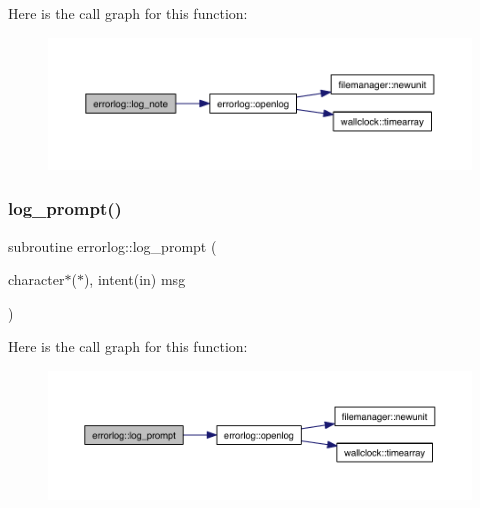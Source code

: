 Here is the call graph for this function\+:\nopagebreak
\begin{figure}[H]
\begin{center}
\leavevmode
\includegraphics[width=350pt]{namespaceerrorlog_abcaf87ab55e0634007cc7177aa53469c_cgraph}
\end{center}
\end{figure}
\mbox{\label{namespaceerrorlog_ac6531d63b5a5d4939c3d510dd7fbbb25}} 
\subsubsection{\texorpdfstring{log\+\_\+prompt()}{log\_prompt()}}
{\footnotesize\ttfamily subroutine errorlog\+::log\+\_\+prompt (\begin{DoxyParamCaption}\item[{character$\ast$($\ast$), intent(in)}]{msg }\end{DoxyParamCaption})\hspace{0.3cm}{\ttfamily [private]}}

Here is the call graph for this function\+:\nopagebreak
\begin{figure}[H]
\begin{center}
\leavevmode
\includegraphics[width=350pt]{namespaceerrorlog_ac6531d63b5a5d4939c3d510dd7fbbb25_cgraph}
\end{center}
\end{figure}
\mbox{\label{namespaceerrorlog_afe1872ea4ca114ccb25faaa2f2d60e2e}} 
